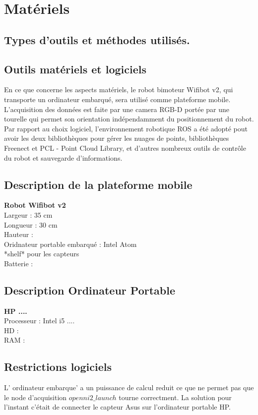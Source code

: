 \section{Matériels}

\subsection{Types d'outils et méthodes utilisés.}

\subsection{Outils matériels et logiciels}
En ce que concerne les aspects matériels, le robot bimoteur Wifibot v2, qui transporte un ordinateur embarqué, sera utilisé comme plateforme mobile. L'acquisition des données est faite par une camera RGB-D portée par une tourelle qui permet son orientation indépendamment du positionnement du robot.
Par rapport au choix logiciel, l'environnement robotique ROS a été adopté pout avoir les deux bibliothèques pour gérer les nuages de points,  bibliothèques Freenect et PCL - Point Cloud Library, et d'autres nombreux outils de contrôle du robot et sauvegarde d'informations.

\subsection{ Description de la plateforme mobile }

\textbf{Robot Wifibot v2 }\\
Largeur : 35 cm \\
Longueur : 30 cm \\
Hauteur : \\
Oridnateur portable embarqué : Intel Atom \\
*shelf* pour les capteurs \\
Batterie :\\

\subsection{Description Ordinateur Portable}

\textbf{HP ....}\\
Processeur : Intel i5 .... \\
HD : \\
RAM : \\


\subsection{Restrictions logiciels}
L' ordinateur embarque' a un puissance de calcul reduit ce que ne permet pas que le node d'acquisition \(openni2\_launch\) tourne correctment. La solution pour l'instant c'était de connecter le capteur Asus sur l'ordinateur portable HP.

